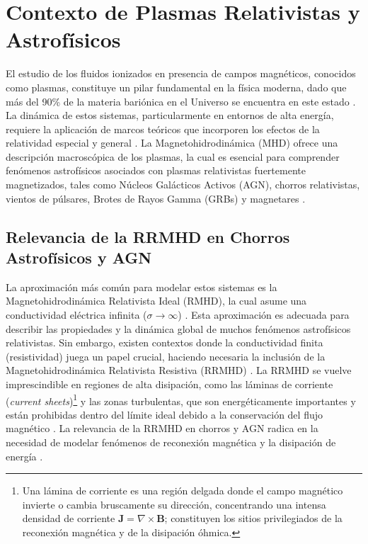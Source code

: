 
\section{Contexto de Plasmas Relativistas y Astrofísicos}

\primerparrafo El estudio de los fluidos ionizados en presencia de campos magnéticos, conocidos como plasmas, constituye un pilar fundamental en la física moderna, dado que más del 90\% de la materia bariónica en el Universo se encuentra en este estado \parencite{goedbloed-2004A}. La dinámica de estos sistemas, particularmente en entornos de alta energía, requiere la aplicación de marcos teóricos que incorporen los efectos de la relatividad especial y general \parencite{rezzolla-2013}. La Magnetohidrodinámica (MHD) ofrece una descripción macroscópica de los plasmas, la cual es esencial para comprender fenómenos astrofísicos asociados con plasmas relativistas fuertemente magnetizados, tales como Núcleos Galácticos Activos (AGN), chorros relativistas, vientos de púlsares, Brotes de Rayos Gamma (GRBs) y magnetares \parencite{goedbloed-2004A, rezzolla-2013}.

\subsection{Relevancia de la RRMHD en Chorros Astrofísicos y AGN}

\primerparrafo La aproximación más común para modelar estos sistemas es la Magnetohidrodinámica Relativista Ideal (RMHD), la cual asume una conductividad eléctrica infinita ($\sigma \to \infty$) \parencite{palenzuela-2009}. Esta aproximación es adecuada para describir las propiedades y la dinámica global de muchos fenómenos astrofísicos relativistas. Sin embargo, existen contextos donde la conductividad finita (resistividad) juega un papel crucial, haciendo necesaria la inclusión de la Magnetohidrodinámica Relativista Resistiva (RRMHD) \parencite{palenzuela-2009, miranda-aranguren-2018}. La RRMHD se vuelve imprescindible en regiones de alta disipación, como las láminas de corriente (\textit{current sheets})\footnote{Una lámina de corriente es una región delgada donde el campo magnético invierte o cambia bruscamente su dirección, concentrando una intensa densidad de corriente $\mathbf{J}=\nabla\times\mathbf{B}$; constituyen los sitios privilegiados de la reconexión magnética y de la disipación óhmica.} y las zonas turbulentas, que son energéticamente importantes y están prohibidas dentro del límite ideal debido a la conservación del flujo magnético \parencite{palenzuela-2009, miranda-aranguren-2018}. La relevancia de la RRMHD en chorros y AGN radica en la necesidad de modelar fenómenos de reconexión magnética y la disipación de energía \parencite{palenzuela-2009, miranda-aranguren-2018}.


